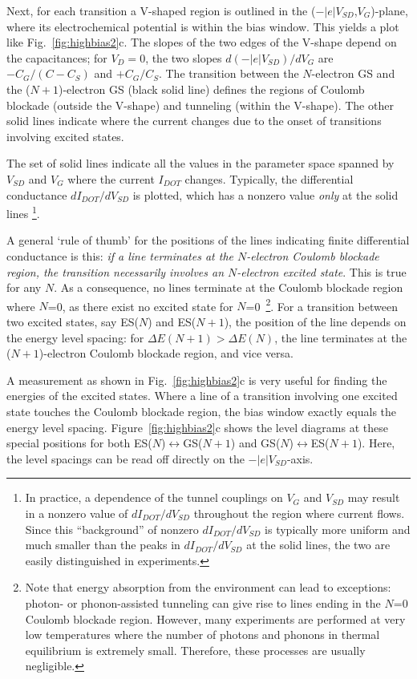 \documentclass[rmp,twocolumn,aps]{revtex4}
\begin{document}
Next, for each transition a V-shaped region is outlined in the
($-\left|e\right|V_{SD}$,${V_G}$)-plane, where its electrochemical
potential is within the bias window. This yields a plot like
Fig.~\ref{fig:highbias2}c. The slopes of the two edges of the
V-shape depend on the capacitances; for $V_D=0$, the two slopes
$d(-\left|e\right|V_{SD})/d{V_G}$ are $-C_G/(C\!-\!C_S)$ and
$+C_G/C_S$. The transition between the $N$-electron GS and the
($N\!+\!1$)-electron GS (black solid line) defines the regions of
Coulomb blockade (outside the V-shape) and tunneling (within the
V-shape). The other solid lines indicate where the current changes
due to the onset of transitions involving excited states. 

The set of solid lines indicate all the values in the parameter space spanned by $V_{SD}$ and ${V_G}$ where the current $I_{DOT}$ changes. Typically, the differential conductance $dI_{DOT}/dV_{SD}$ is plotted, which has a nonzero value \textit{only} at the solid lines \footnote{In practice, a dependence of the tunnel couplings on $V_G$ and $V_{SD}$ may result in a nonzero value of $dI_{DOT}/dV_{SD}$ throughout the region where current flows. Since this ``background'' of nonzero $dI_{DOT}/dV_{SD}$ is typically more uniform and much smaller than the peaks in $dI_{DOT}/dV_{SD}$ at the solid lines, the two are easily distinguished in experiments.}.

A general `rule of thumb' for the positions of the lines indicating finite differential conductance is this: \textit{if a line terminates at
the $N$-electron Coulomb blockade region, the transition
necessarily involves an $N$-electron excited state}. This is true
for any $N$. As a consequence, no lines terminate at the Coulomb
blockade region where $N$=0, as there exist no excited state for
$N$=0~\footnote{Note that energy absorption from the environment
can lead to exceptions: photon- or phonon-assisted tunneling can
give rise to lines ending in the $N$=0 Coulomb blockade region.
However, many experiments are performed at very low temperatures
where the number of photons and phonons in thermal equilibrium is
extremely small. Therefore, these processes are usually
negligible.}. For a transition between two excited states, say
ES($N$) and ES($N\!+\!1$), the position of the line depends on the
energy level spacing: for $\Delta E(N\!+\!1)>\Delta E(N)$, the
line terminates at the ($N\!+\!1$)-electron Coulomb blockade
region, and vice versa.

A measurement as shown in Fig.~\ref{fig:highbias2}c is very useful
for finding the energies of the excited states. Where a line of a
transition involving one excited state touches the Coulomb
blockade region, the bias window exactly equals the energy level
spacing. Figure~\ref{fig:highbias2}c shows the level diagrams at
these special positions for both
ES($N$)$\leftrightarrow$GS($N\!+\!1$) and
GS($N$)$\leftrightarrow$ES($N\!+\!1$). Here, the level spacings
can be read off directly on the $-\left|e\right|V_{SD}$-axis.
\end{document}
